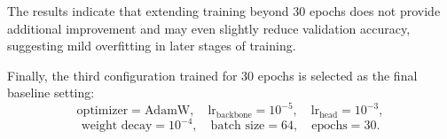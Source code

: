 The results indicate that extending training beyond 30 epochs does not provide additional improvement and may even slightly reduce validation accuracy, suggesting mild overfitting in later stages of training.

Finally, the third configuration trained for 30 epochs is selected as the final baseline setting:
\[
\text{optimizer} = \text{AdamW}, \quad
\text{lr}_{\text{backbone}} = 10^{-5}, \quad
\text{lr}_{\text{head}} = 10^{-3},
\]
\[
\text{weight decay} = 10^{-4}, \quad
\text{batch size} = 64, \quad
\text{epochs} = 30.
\]
